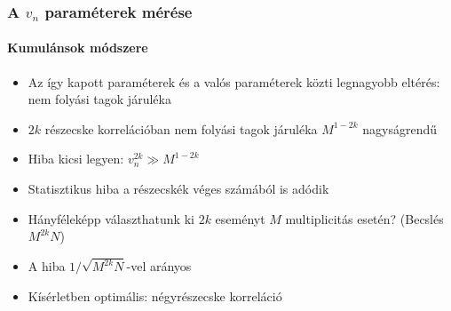 \documentclass{beamer}
\begin{document}
\begin{frame}
\frametitle{A $v_n$ paraméterek mérése}
\framesubtitle{Kumulánsok módszere}
\begin{itemize}
\item Az így kapott paraméterek és a valós paraméterek közti legnagyobb eltérés: nem folyási tagok járuléka
\item $2k$ részecske korrelációban nem folyási tagok járuléka $M^{1-2k}$ nagyságrendű
\item Hiba kicsi legyen: $v_n^{2k}\gg M^{1-2k}$
\item Statisztikus hiba a részecskék véges számából is adódik
\item Hányféleképp választhatunk ki $2k$ eseményt $M$ multiplicitás esetén? (Becslés $M^{2k}N$)
\item A hiba $1/\sqrt{M^{2k}N}$-vel arányos
\item Kísérletben optimális: négyrészecske korreláció
\end{itemize}
\end{frame}
\end{document}
